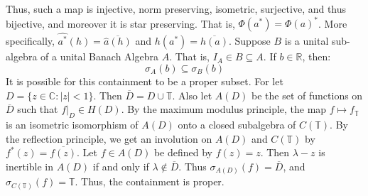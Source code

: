     Thus, such a map is injective, norm preserving, isometric,
    surjective, and thus bijective, and moreover it is star
    preserving. That is, $\Phi(a^{*})=\Phi(a)^{*}$. More
    specifically, $\hat{a^{*}}(h)=\overline{\hat{a}(h)}$ and
    $h(a^{*})=\overline{h(a)}$.
    Suppose $B$ is a unital sub-algebra of a unital Banach
    Algebra $A$. That is, $I_{A}\in{B}\subseteq{A}$. If
    $b\in\mathbb{R}$, then:
    \begin{equation}
        \sigma_{A}(b)\subseteq\sigma_{B}(b)
    \end{equation}
    It is possible for this containment to be a proper subset.
    For let $D=\{z\in\mathbb{C}:|z|<1\}$. Then
    $\overline{D}=D\cup\mathbb{T}$. Also let
    $A(D)$ be the set of functions on $\overline{D}$ such that
    $f|_{D}\in{H}(D)$. By the maximum modulus principle, the
    map $f\mapsto{f}_{\mathbb{T}}$ is an isometric
    isomorphism of $A(D)$ onto a closed subalgebra of
    $C(\mathbb{T})$. By the reflection principle, we get an
    involution on $A(D)$ and $C(\mathbb{T})$ by
    $f^{*}(z)=\overline{f(z)}$. Let $f\in{A}(D)$ be defined by
    $f(z)=z$. Then $\lambda-z$ is inertible in $A(D)$ if and
    only if $\lambda\notin\overline{D}$. Thus
    $\sigma_{A(D)}(f)=\overline{D}$, and
    $\sigma_{C(\mathbb{T})}(f)=\mathbb{T}$. Thus, the containment
    is proper.
